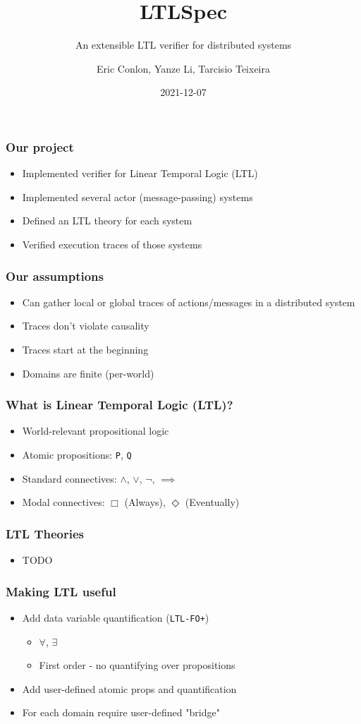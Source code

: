 \documentclass[12pt,aspectratio=169]{beamer}
\title{LTLSpec}
\subtitle{An extensible LTL verifier for distributed systems}
\author{Eric Conlon, Yanze Li, Tarcisio Teixeira}
\date{2021-12-07}
\begin{document}
\frame{\titlepage}

\begin{frame}
\frametitle{Our project}
\begin{itemize}
  \item Implemented verifier for Linear Temporal Logic (LTL)
  \item Implemented several actor (message-passing) systems
  \item Defined an LTL theory for each system
  \item Verified execution traces of those systems
\end{itemize}
\end{frame}

\begin{frame}
\frametitle{Our assumptions}
\begin{itemize}
  \item Can gather local or global traces of actions/messages in a distributed system
  \item Traces don't violate causality
  \item Traces start at the beginning
  \item Domains are finite (per-world)
\end{itemize}
\end{frame}

\begin{frame}
\frametitle{What is Linear Temporal Logic (LTL)?}
\begin{itemize}
  \item World-relevant propositional logic
  \item Atomic propositions: \texttt{P}, \texttt{Q}
  \item Standard connectives: $\land$, $\lor$, $\neg$, $\implies$
  \item Modal connectives: $\Box$ (Always), $\Diamond$ (Eventually)
\end{itemize}
\end{frame}

\begin{frame}
\frametitle{LTL Theories}
\begin{itemize}
  \item TODO
\end{itemize}
\end{frame}

\begin{frame}
\frametitle{Making LTL useful}
\begin{itemize}
  \item Add data variable quantification (\texttt{LTL-FO+})
  \begin{itemize}
    \item $\forall$, $\exists$
    \item First order - no quantifying over propositions
  \end{itemize}
  \item Add user-defined atomic props and quantification
  \item For each domain require user-defined "bridge"
\end{itemize}
\end{frame}
\end{document}
